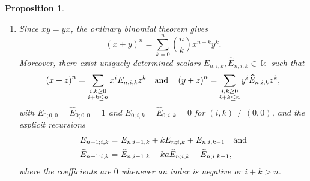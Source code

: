 \documentclass{amsart}
\newtheorem{proposition}[theorem]{Proposition}
\theoremstyle{definition}
\theoremstyle{remark}
\numberwithin{equation}{section}
\begin{document}
\begin{proposition}
\begin{enumerate}
\item[\rm (5)] Since $xy=yx$, the ordinary binomial theorem gives
\[
(x+y)^n=\sum_{k=0}^{n}\binom{n}{k}x^{n-k}y^{k}.
\]
Moreover, there exist uniquely determined scalars $E_{n;i,k}, \widehat E_{n;i,k}\in\Bbbk$ such that
\begin{equation}\label{Exzdefcase5v}
\left(x+z\right)^n=\sum_{\substack{i,k\ge 0\\ i+k\le n}} x^{i}E_{n;i,k} z^{k} \quad {\rm and} \quad \left(y+z\right)^n=\sum_{\substack{i,k\ge 0\\ i+k\le n}} y^{i}\widehat E_{n;i,k} z^{k},
\end{equation}
with $E_{0;0,0}=\widehat E_{0;0,0}=1$ and $E_{0;i,k}=\widehat E_{0;i,k}=0$ for $(i,k)\neq(0,0)$, and the explicit recursions
\begin{align}
E_{n+1;i,k} = &\ E_{n;i-1,k}+k E_{n;i,k}+E_{n;i,k-1} \quad {\rm and} \label{Exzreccase5v}\\
\widehat E_{n+1;i,k} = &\ \widehat E_{n;i-1,k}-ka \widehat E_{n;i,k}+\widehat E_{n;i,k-1},\label{Eyzreccase5v}
\end{align}
where the coefficients are $0$ whenever an index is negative or $i+k>n$.
\end{enumerate}
\end{proposition}
\end{document}
